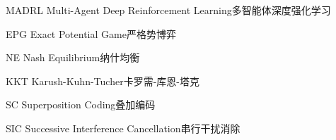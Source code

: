 \begin{abbreviate}[0mm][15mm]
	\item[MADRL] Multi-Agent Deep Reinforcement Learning\hspace{1em}多智能体深度强化学习
	\item[EPG] Exact Potential Game\hspace{1em}严格势博弈
	\item[NE] Nash Equilibrium\hspace{1em}纳什均衡
	\item[KKT] Karush-Kuhn-Tucher\hspace{1em}卡罗需-库恩-塔克
	\item[SC] Superposition Coding\hspace{1em}叠加编码
	\item[SIC] Successive Interference Cancellation\hspace{1em}串行干扰消除
\end{abbreviate}

\endinput